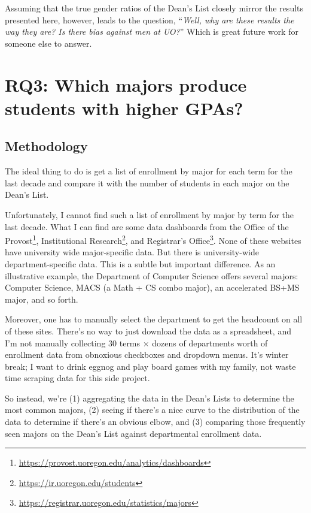 \documentclass[10pt]{article}
\begin{document}
Assuming that the true gender ratios of the Dean's List closely mirror the results presented here, however, leads to the question, ``\textit{Well, why are these results the way they are? Is there bias against men at UO?}'' Which is great future work for someone else to answer.

\section{RQ3: Which majors produce students with higher GPAs?}

\subsection{Methodology}

The ideal thing to do is get a list of enrollment by major for each term for the last decade and compare it with the number of students in each major on the Dean's List.

Unfortunately, I cannot find such a list of enrollment by major by term for the last decade. What I can find are some data dashboards from the Office of the Provost\footnote{\url{https://provost.uoregon.edu/analytics/dashboards}}, Institutional Research\footnote{\url{https://ir.uoregon.edu/students}}, and Registrar's Office\footnote{\url{https://registrar.uoregon.edu/statistics/majors}}. None of these websites have university wide major-specific data. But there is university-wide department-specific data. This is a subtle but important difference. As an illustrative example, the Department of Computer Science offers several majors: Computer Science, MACS (a Math + CS combo major), an accelerated BS+MS major, and so forth.

Moreover, one has to manually select the department to get the headcount on all of these sites. There's no way to just download the data as a spreadsheet, and I'm not manually collecting 30 terms $\times$ dozens of departments worth of enrollment data from obnoxious checkboxes and dropdown menus. It's winter break; I want to drink eggnog and play board games with my family, not waste time scraping data for this side project.

So instead, we're (1) aggregating the data in the Dean's Lists to determine the most common majors, (2) seeing if there's a nice curve to the distribution of the data to determine if there's an obvious elbow, and (3) comparing those frequently seen majors on the Dean's List against departmental enrollment data.
\end{document}
